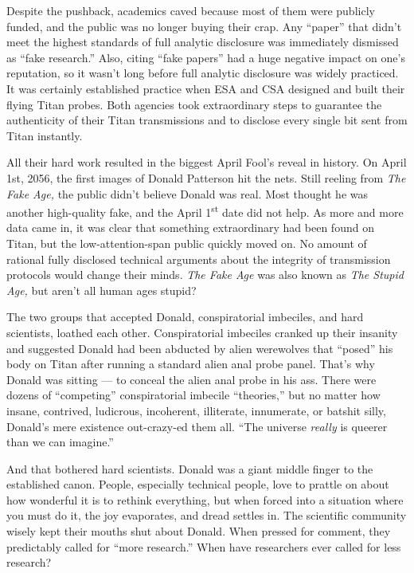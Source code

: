 Despite the pushback, academics caved because most of them were publicly
funded, and the public was no longer buying their crap. Any ``paper''
that didn't meet the highest standards of full analytic disclosure was
immediately dismissed as ``fake research.'' Also, citing ``fake papers''
had a huge negative impact on one's reputation, so it wasn't long before
full analytic disclosure was widely practiced. It was certainly
established practice when ESA and CSA designed and built their flying
Titan probes. Both agencies took extraordinary steps to guarantee the
authenticity of their Titan transmissions and to disclose every single
bit sent from Titan instantly.

All their hard work resulted in the biggest April Fool's reveal in
history. On April 1st, 2056, the first images of Donald Patterson hit
the nets. Still reeling from \emph{The Fake Age,} the public didn't
believe Donald was real. Most thought he was another high-quality fake,
and the April 1\textsuperscript{st} date did not help. As more and more
data came in, it was clear that something extraordinary had been found
on Titan, but the low-attention-span public quickly moved on. No amount
of rational fully disclosed technical arguments about the integrity of
transmission protocols would change their minds. \emph{The Fake Age} was
also known as \emph{The Stupid Age,} but aren't all human ages stupid?

The two groups that accepted Donald, conspiratorial imbeciles, and hard
scientists, loathed each other. Conspiratorial imbeciles cranked up
their insanity and suggested Donald had been abducted by alien
werewolves that ``posed'' his body on Titan after running a standard
alien anal probe panel. That's why Donald was sitting --- to conceal the
alien anal probe in his ass. There were dozens of ``competing''
conspiratorial imbecile ``theories,'' but no matter how insane,
contrived, ludicrous, incoherent, illiterate, innumerate, or batshit
silly, Donald's mere existence out-crazy-ed them all. ``The universe
\emph{really} is queerer than we can imagine.''

And that bothered hard scientists. Donald was a giant middle finger to
the established canon. People, especially technical people, love to
prattle on about how wonderful it is to rethink everything, but when
forced into a situation where you must do it, the joy evaporates, and
dread settles in. The scientific community wisely kept their mouths shut
about Donald. When pressed for comment, they predictably called for
``more research.'' When have researchers ever called for less research?

